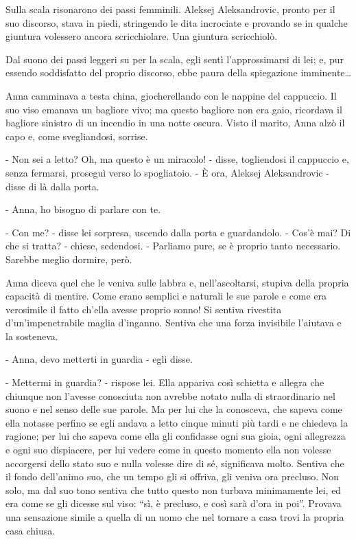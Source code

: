 Sulla scala risonarono dei passi femminili. Aleksej Aleksandrovic, pronto per il suo discorso, stava in piedi, stringendo le dita incrociate e provando se in qualche giuntura volessero ancora scricchiolare. Una giuntura scricchiolò. 

Dal suono dei passi leggeri su per la scala, egli sentì l'approssimarsi di lei; e, pur essendo soddisfatto del proprio discorso, ebbe paura della spiegazione imminente\ldots{} 

\label{ix-1} 

Anna camminava a testa china, giocherellando con le nappine del cappuccio. Il suo viso emanava un bagliore vivo; ma questo bagliore non era gaio, ricordava il bagliore sinistro di un incendio in una notte oscura. Visto il marito, Anna alzò il capo e, come svegliandosi, sorrise. 

- Non sei a letto? Oh, ma questo è un miracolo! - disse, togliendosi il cappuccio e, senza fermarsi, proseguì verso lo spogliatoio. - È ora, Aleksej Aleksandrovic - disse di là dalla porta. 

- Anna, ho bisogno di parlare con te. 

- Con me? - disse lei sorpresa, uscendo dalla porta e guardandolo. - Cos'è mai? Di che si tratta? - chiese, sedendosi. - Parliamo pure, se è proprio tanto necessario. Sarebbe meglio dormire, però. 

Anna diceva quel che le veniva sulle labbra e, nell'ascoltarsi, stupiva della propria capacità di mentire. Come erano semplici e naturali le sue parole e come era verosimile il fatto ch'ella avesse proprio sonno! Si sentiva rivestita d'un'impenetrabile maglia d'inganno. Sentiva che una forza invisibile l'aiutava e la sosteneva. 

- Anna, devo metterti in guardia - egli disse. 

- Mettermi in guardia? - rispose lei. Ella appariva così schietta e allegra che chiunque non l'avesse conosciuta non avrebbe notato nulla di straordinario nel suono e nel senso delle sue parole. Ma per lui che la conosceva, che sapeva come ella notasse perfino se egli andava a letto cinque minuti più tardi e ne chiedeva la ragione; per lui che sapeva come ella gli confidasse ogni sua gioia, ogni allegrezza e ogni suo dispiacere, per lui vedere come in questo momento ella non volesse accorgersi dello stato suo e nulla volesse dire di sé, significava molto. Sentiva che il fondo dell'animo suo, che un tempo gli si offriva, gli veniva ora precluso. Non solo, ma dal suo tono sentiva che tutto questo non turbava minimamente lei, ed era come se gli dicesse sul viso: ``sì, è precluso, e così sarà d'ora in poi''. Provava una sensazione simile a quella di un uomo che nel tornare a casa trovi la propria casa chiusa. 

